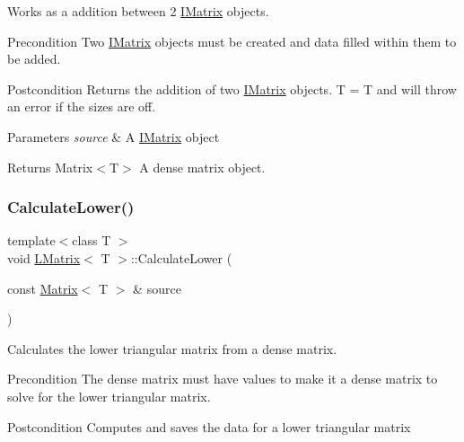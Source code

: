 Works as a addition between 2 \mbox{\hyperlink{class_i_matrix}{I\+Matrix}} objects. 

\begin{DoxyPrecond}{Precondition}
Two \mbox{\hyperlink{class_i_matrix}{I\+Matrix}} objects must be created and data filled within them to be added. 
\end{DoxyPrecond}
\begin{DoxyPostcond}{Postcondition}
Returns the addition of two \mbox{\hyperlink{class_i_matrix}{I\+Matrix}} objects. T = T and will throw an error if the sizes are off.
\end{DoxyPostcond}

\begin{DoxyParams}{Parameters}
{\em source} & A \mbox{\hyperlink{class_i_matrix}{I\+Matrix}} object \\
\hline
\end{DoxyParams}
\begin{DoxyReturn}{Returns}
Matrix$<$\+T$>$ A dense matrix object. 
\end{DoxyReturn}
\mbox{\label{class_l_matrix_a9a70080e771867dd76c983fe1f8c2c15}} 
\subsubsection{\texorpdfstring{CalculateLower()}{CalculateLower()}}
{\footnotesize\ttfamily template$<$class T $>$ \\
void \mbox{\hyperlink{class_l_matrix}{L\+Matrix}}$<$ T $>$\+::Calculate\+Lower (\begin{DoxyParamCaption}\item[{const \mbox{\hyperlink{class_matrix}{Matrix}}$<$ T $>$ \&}]{source }\end{DoxyParamCaption})}



Calculates the lower triangular matrix from a dense matrix. 

\begin{DoxyPrecond}{Precondition}
The dense matrix must have values to make it a dense matrix to solve for the lower triangular matrix. 
\end{DoxyPrecond}
\begin{DoxyPostcond}{Postcondition}
Computes and saves the data for a lower triangular matrix
\end{DoxyPostcond}

